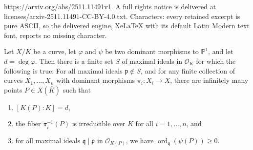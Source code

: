 \documentclass[10pt,a4paper]{amsart}
\newcommand{\Kbar}{\overline{K}}
\newcommand{\bbP}{\mathbb{P}}
\newcommand{\calO}{\mathcal{O}}
\newcommand{\frakp}{\mathfrak{p}}
\newcommand{\frakq}{\mathfrak{q}}
\newcommand{\ord}{\operatorname{ord}}
\begin{document}
https://arxiv.org/abs/2511.11491v1. A full rights notice is delivered at licenses/arxiv-2511.11491-CC-BY-4.0.txt. Characters: every retained excerpt is pure ASCII, so the delivered engine, XeLaTeX with its default Latin Modern text font, reports no missing character.
\begin{lem}\label{lem:HIT}
    Let $X/K$ be a curve, let $\varphi$ and $\psi$ be two dominant morphisms to $\bbP^1$, and let $d = \deg\varphi$. Then there is a finite set $S$ of maximal ideals in $\calO_K$ for which the following is true: For all maximal ideals $\frakp \notin S$, and for any finite collection of curves $X_1,\ldots,X_n$ with dominant morphisms $\pi_i : X_i \to X$, there are infinitely many points $P\in X(\Kbar)$ such that
        \begin{enumerate}[label={\textup{(\roman*)}}]
        \item $[K(P) : K] = d$,
        \item the fiber $\pi_i^{-1}(P)$ is irreducible over $K$ for all $i = 1,\ldots,n$, and
        \item for all maximal ideals $\frakq\mid\frakp$ in $\calO_{K(P)}$, we have $\ord_\frakq(\psi(P)) \ge 0$.
        \end{enumerate}
\end{lem}
\end{document}
